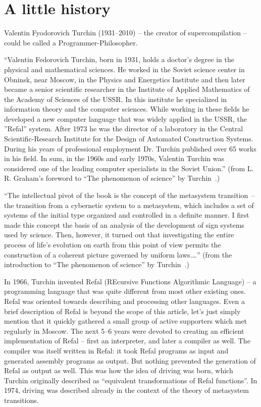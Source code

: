 \section{A little history}

Valentin Fyodorovich Turchin (1931--2010) -- the creator of supercompilation --
could be called a Programmer-Philosopher.

``Valentin Fedorovich Turchin, born in 1931, holds a doctor's degree in the physical and mathematical sciences. 
He worked in the Soviet science center in Obninsk, near Moscow, 
in the Physics and Energetics Institute and then later became a senior scientific researcher 
in the Institute of Applied Mathematics of the Academy of Sciences of the USSR. 
In this institute he specialized in information theory and the computer sciences. 
While working in these fields he developed a new computer language that was widely 
applied in the USSR, the ''Refal'' system. 
After 1973 he was the director of a laboratory in the 
Central Scientific-Research Institute for the Design of Automated Construction Systems. 
During his years of professional employment Dr. Turchin published over 65 works in his field. 
In sum, in the 1960s and early 1970s, Valentin Turchin was considered one of 
the leading computer specialists in the Soviet Union.'' 
(from L. R. Graham's foreword to ``The phenomenon of science'' by Turchin~\cite{Turchin1977Phenomenon}.)

``The intellectual pivot of the book is the concept of the metasystem transition~--
the transition from a
cybernetic system to a metasystem, which includes a set of systems of the initial type organized and controlled in a definite manner. 
I first made this concept the basis of an analysis of the development of sign systems used by science. 
Then, however, it turned out that investigating the entire process of life's evolution on earth 
from this point of view permits the construction of a coherent picture governed by uniform laws.\ldots''
(from the introduction to ``The phenomenon of science'' by Turchin~\cite{Turchin1977Phenomenon}.)

In 1966, Turchin invented Refal (REcursive Functions Algorithmic Language) --
a programming language that was quite different from most other existing ones.
Refal was oriented towards describing and processing other languages.
Even a brief description of Refal is beyond the scope of this article, 
let's just simply mention that it quickly gathered a small group of active supporters
which met regularly in Moscow. 
The next 5--6 years were devoted to creating an efficient implementation of Refal
-- first an interpreter, and later a compiler as well.
The compiler was itself written in Refal: it took Refal programs as input
and generated assembly programs as output.
But nothing prevented the generation of Refal as output as well.
This was how the idea of driving was born, which Turchin
originally described as ``equivalent transformations of Refal functions''.
In 1974, driving was described already in the context of the
theory of metasystem transitions.

